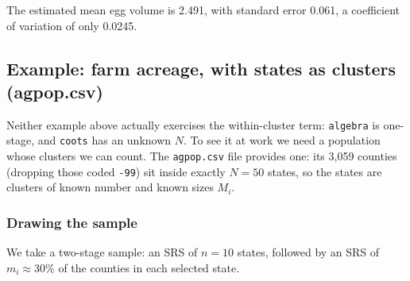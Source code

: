 \documentclass[
  letterpaper,
  DIV=11,
  numbers=noendperiod]{scrreprt}
\renewcommand{\[}{\begin{equation}}
\renewcommand{\]}{\end{equation}}
\begin{document}
The estimated mean egg volume is 2.491, with standard error 0.061, a
coefficient of variation of only 0.0245.

\subsection{Example: farm acreage, with states as clusters
(agpop.csv)}\label{sec-cluster-agpop}

Neither example above actually exercises the within-cluster term:
\texttt{algebra} is one-stage, and \texttt{coots} has an unknown \(N\).
To see it at work we need a population whose clusters we can count. The
\texttt{agpop.csv} file provides one: its 3,059 counties (dropping those
coded \texttt{-99}) sit inside exactly \(N = 50\) states, so the states
are clusters of known number and known sizes \(M_i\).

\subsubsection*{Drawing the sample}\label{drawing-the-sample}

We take a two-stage sample: an SRS of \(n = 10\) states, followed by an
SRS of \(m_i \approx 30\%\) of the counties in each selected state.
\end{document}

